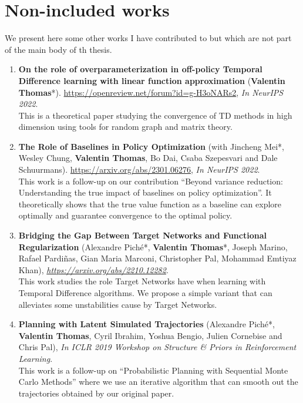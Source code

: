 \chapter*{Non-included works}
We present here some other works I have contributed to but which are not part of the main body of th thesis.

\begin{enumerate}
\item{\bf On the role of overparameterization in off-policy Temporal
Difference learning with linear function
approximation} (\textbf{Valentin Thomas}*). \url{https://openreview.net/forum?id=g-H3oNARs2}, {\em In {\color{blue} NeurIPS 2022}}.\\
This is a theoretical paper studying the convergence of TD methods in high dimension using tools for random graph and matrix theory.

\item{\bf The Role of Baselines in Policy Optimization}
    (with Jincheng Mei*, Wesley Chung, \textbf{Valentin Thomas}, Bo Dai, Csaba
    Szepesvari and Dale Schuurmans).  \url{https://arxiv.org/abs/2301.06276}, {\em In {\color{blue} NeurIPS 2022}}.\\
    This work is a follow-up on our contribution ``Beyond variance reduction: Understanding the true impact of baselines on policy optimization''. It theoretically shows that the true value function as a baseline can explore optimally and guarantee convergence to the optimal policy.
    
\item{\bf Bridging the Gap Between Target Networks and Functional Regularization}
    (Alexandre Pich\'{e}*, \textbf{Valentin Thomas}*, Joseph Marino, Rafael Pardi\~{n}as, Gian Maria Marconi, Christopher Pal, Mohammad Emtiyaz Khan), {\em \url{https://arxiv.org/abs/2210.12282}}.\\
    This work studies the role Target Networks have when learning with Temporal Difference algorithms. We propose a simple variant that can alleviates some unstabilities cause by Target Networks.

\item{\bf Planning with Latent Simulated Trajectories} (Alexandre Pich\'{e}*, \textbf{Valentin Thomas}, Cyril Ibrahim, Yoshua Bengio, Julien Cornebise and Chris
    Pal), {\em  In {\color{olive} ICLR 2019 Workshop} on Structure \& Priors in Reinforcement
Learning}.\\
This work is a follow-up on ``Probabilistic Planning with Sequential Monte Carlo Methods'' where we use an iterative algorithm that can smooth out the trajectories obtained by our original paper.


\end{enumerate}
